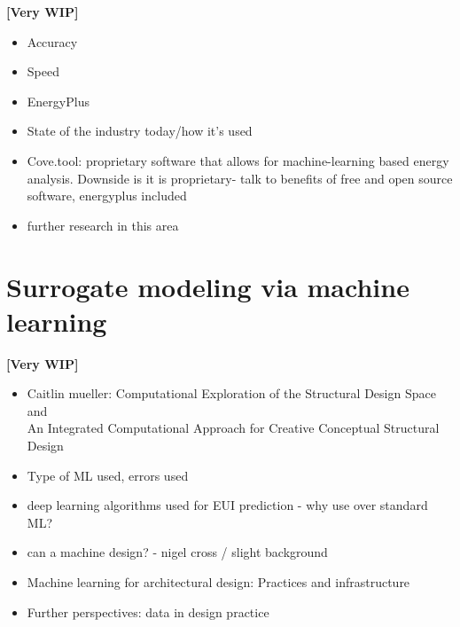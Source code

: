 \textbf{[Very WIP]}

\begin{itemize}
 	\item Accuracy
	\item Speed 
	\item EnergyPlus
	\item State of the industry today/how it’s used
	\item Cove.tool: proprietary software that allows for machine-learning based energy analysis. 
	Downside is it is proprietary- talk to benefits of free and open source software, energyplus included
	\item further research in this area
\end{itemize}


\section{Surrogate modeling via machine learning}

\textbf{[Very WIP]}

\begin{itemize}
	\item Caitlin mueller: Computational Exploration of the Structural Design Space and \\ An Integrated Computational Approach for Creative Conceptual Structural Design
	\item Type of ML used, errors used
	\item deep learning algorithms used for EUI prediction - why use over standard ML?
	\item can a machine design? - nigel cross / slight background
	\item Machine learning for architectural design: Practices and infrastructure
	\item Further perspectives: data in design practice
\end{itemize}

